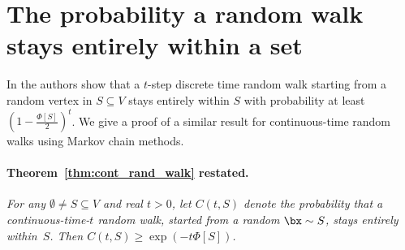 \documentclass[11pt]{article}
\begin{document}
\section{The probability a random walk stays entirely within a set}

In \cite{OT12} the authors show that a $t$-step discrete time random walk starting from a random vertex in $S \subseteq V$ stays entirely within $S$ with probability at least $\left(1-\frac{\Phi[S]}{2}\right)^t$.  We give a proof of a similar result for continuous-time random walks using Markov chain methods.

\paragraph{Theorem~\ref{thm:cont_rand_walk} restated.} \emph{For any $\emptyset \neq S \subseteq V$ and real $t > 0$, let $C(t,S)$ denote the probability that a continuous-time-$t$ random walk, started from a random $\bx \sim S$, stays entirely within~$S$.  Then $C(t,S) \geq \exp(-t\Phi[S])$.}
\end{document}
